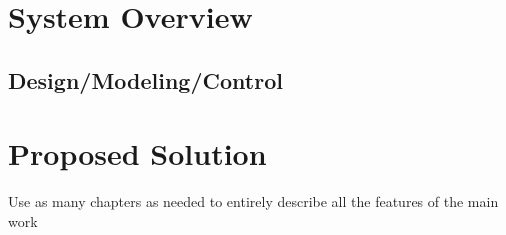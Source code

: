 \chapter{System Overview}
\label{cap:system}
\lhead{\textbf{\rightmark}}

\section{Design/Modeling/Control}
\label{sec:feature}

\chapter{Proposed Solution}
\label{cap:solution}
\lhead{\textbf{\rightmark}}

Use as many chapters as needed to entirely describe all the features of the main work